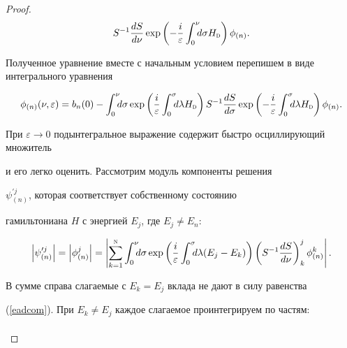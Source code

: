 \begin{proof}
\begin{equation*}
  S^{-1}\frac{dS}{d\nu}

  \exp\left(-\frac i\varepsilon \int_0^\nu \!\!\! d\sigma H_{\textsc{d}}\right)\phi_{(n)}.

\end{equation*}

Полученное уравнение вместе с начальным условием перепишем в виде интегрального уравнения

\begin{equation}                                                  \label{einteq}

  \phi_{(n)}(\nu,\varepsilon )=b_n(0)-\int_0^\nu\!\!\! d\sigma 

  \exp\left(\frac i\varepsilon \int_0^\sigma \!\!\! d\lambda H_{\textsc{d}}\right)

  S^{-1}\frac{dS}{d\sigma }\exp\left(-\frac i\varepsilon \int_0^\sigma \!\!\! d\lambda H_{\textsc{d}}\right)

  \phi_{(n)}.

\end{equation}

При $\varepsilon \to0$ подынтегральное выражение содержит быстро осциллирующий множитель

и его легко оценить. Рассмотрим модуль компоненты решения

$\psi^{\prime j}_{(n)}$, которая соответствует собственному состоянию

гамильтониана $H$ с энергией $E_j$, где $E_j\ne E_n$:

\begin{equation}                                                  \label{ecopgj}

  \left|\psi^{\prime j}_{(n)}\right|=\left|\phi^j_{(n)}\right|

  =\left|\sum_{k=1}^{\textsc{n}}\int_0^{\nu}\!\!\! d\sigma

  \exp\left(\frac i\varepsilon \int_0^\sigma \!\!\! d\lambda(E_j-E_k)\right)

  \left(S^{-1}\frac{dS}{d\nu}\right)_k^j\phi^k_{(n)}\right|.

\end{equation}

В сумме справа слагаемые с $E_k=E_j$ вклада не дают в силу равенства

(\ref{eadcom}). При $E_k\ne E_j$ каждое слагаемое проинтегрируем по частям:

\begin{multline}                                                  \label{eotska}


\end{multline}
\end{proof}
